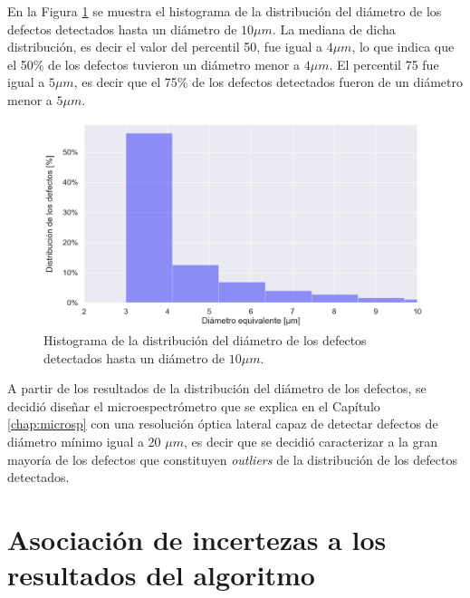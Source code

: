 En la Figura \ref{fig:boxpl} se muestra el histograma de la distribución del diámetro de los defectos detectados hasta un diámetro de $10 \mu m$. La mediana de dicha distribución, es decir el valor del percentil 50, fue igual a $4\mu m$, lo que indica que el 50\% de los defectos tuvieron un diámetro menor a $4 \mu m$. El percentil 75 fue igual a $5 \mu m$, es decir que el 75\% de los defectos detectados fueron de un diámetro menor a $5 \mu m$.
\begin{figure}
\centering
\includegraphics[width=1.0\textwidth]{Figs/cuantificaciondefectos/chauboxx.png}
\caption{Histograma de la distribución del diámetro de los defectos detectados hasta un diámetro de $10 \mu m$.}
\label{fig:boxpl}
\end{figure}
A partir de los resultados de la distribución del diámetro de los defectos, se decidió diseñar el microespectrómetro que se explica en el Capítulo \ref{chap:microsp} con una resolución óptica lateral capaz de detectar defectos de diámetro mínimo igual a 20 $\mu m$, es decir que se decidió caracterizar a la gran mayoría de los defectos que constituyen \textit{outliers} de la distribución de los defectos detectados.

\singlespacing
\section{Asociación de incertezas a los resultados del algoritmo}
\label{sec:incert}

